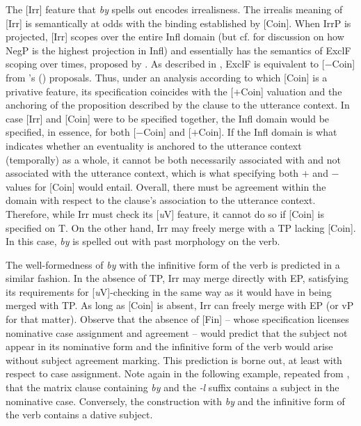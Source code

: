 \documentclass[output=paper,
modfonts,
newtxmath,
hidelinks,
]{langscibook}
\begin{document}
The [Irr] feature that \textit{by} spells out encodes irrealisness. The irrealis meaning of [Irr] is semantically at odds with the binding established by [Coin]. When IrrP is projected, [Irr] scopes over the entire Infl domain (but cf. \citealt{Cowper2010} for discussion on how NegP is the highest projection in Infl) and essentially has the semantics of ExclF scoping over times, proposed by \citet{Iatridou2000}. As described in , ExclF is equivalent to [$-$Coin] from \citeauthor{RitterWiltschko2005}'s (\citeyear{RitterWiltschko2005,RitterWiltschko2014}) proposals. Thus, under an analysis according to which [Coin] is a privative feature, its specification coincides with the [$+$Coin] valuation and the anchoring of the proposition described by the clause to the utterance context. In case [Irr] and [Coin] were to be specified together, the Infl domain would be specified, in essence, for both [$-$Coin] and [$+$Coin]. If the Infl domain is what indicates whether an eventuality is anchored to the utterance context (temporally) as a whole, it cannot be both necessarily associated with and not associated with the utterance context, which is what specifying both $+$ and $-$ values for [Coin] would entail. Overall, there must be agreement within the domain with respect to the clause’s association to the utterance context. Therefore, while Irr must check its [\textit{u}V] feature, it cannot do so if [Coin] is specified on T. On the other hand, Irr may freely merge with a TP lacking [Coin]. In this case, \textit{by} is spelled out with past morphology on the verb.\largerpage

The well-formedness of \textit{by} with the infinitive form of the verb is predicted in a similar fashion. In the absence of TP, Irr may merge directly with EP, satisfying its requirements for [\textit{u}V]-checking in the same way as it would have in being merged with TP. As long as [Coin] is absent, Irr can freely merge with EP (or vP for that matter). Observe that the absence of [Fin] -- whose specification licenses nominative case assignment and agreement -- would predict that the subject not appear in its nominative form and the infinitive form of the verb would arise without subject agreement marking. This prediction is borne out, at least with respect to case assignment. Note again in the following example, repeated from , that the matrix clause containing \textit{by} and the \textit{-l} suffix contains a subject in the nominative case. Conversely, the construction with \textit{by} and the infinitive form of the verb contains a dative subject. 
\end{document}
